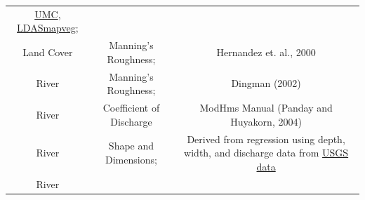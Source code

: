 \documentclass[]{scrbook}
\begin{document}
\begin{longtable}[]{@{}ccc@{}}
\begin{minipage}[t]{0.42\columnwidth}
\href{http://glcf.umiacs.umd.edu/data/landcover/data.shtml}{UMC},
\href{http://ldas.gsfc.nasa.gov/LDAS8th/MAPPED.VEG/LDASmapveg.shtml}{LDASmapveg};\strut
\end{minipage}\tabularnewline
\begin{minipage}[t]{0.11\columnwidth}\centering\strut
Land Cover\strut
\end{minipage} & \begin{minipage}[t]{0.19\columnwidth}\centering\strut
Manning's Roughness;\strut
\end{minipage} & \begin{minipage}[t]{0.42\columnwidth}\centering\strut
Hernandez et. al., 2000\strut
\end{minipage}\tabularnewline
\begin{minipage}[t]{0.11\columnwidth}\centering\strut
River\strut
\end{minipage} & \begin{minipage}[t]{0.19\columnwidth}\centering\strut
Manning's Roughness;\strut
\end{minipage} & \begin{minipage}[t]{0.42\columnwidth}\centering\strut
Dingman (2002)\strut
\end{minipage}\tabularnewline
\begin{minipage}[t]{0.11\columnwidth}\centering\strut
River\strut
\end{minipage} & \begin{minipage}[t]{0.19\columnwidth}\centering\strut
Coefficient of Discharge\strut
\end{minipage} & \begin{minipage}[t]{0.42\columnwidth}\centering\strut
ModHms Manual (Panday and Huyakorn, 2004)\strut
\end{minipage}\tabularnewline
\begin{minipage}[t]{0.11\columnwidth}\centering\strut
River\strut
\end{minipage} & \begin{minipage}[t]{0.19\columnwidth}\centering\strut
Shape and Dimensions;\strut
\end{minipage} & \begin{minipage}[t]{0.42\columnwidth}\centering\strut
Derived from regression using depth, width, and discharge data from
\href{http://nwis.waterdata.usgs.gov/usa/nwis/measurements}{USGS
data}\strut
\end{minipage}\tabularnewline
\begin{minipage}[t]{0.11\columnwidth}\centering\strut
River\strut

\end{minipage}
\end{longtable}
\end{document}
